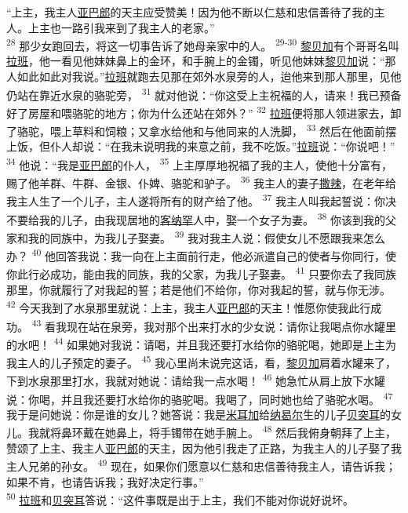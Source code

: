 “上主，我主人\uline{亚巴郎}的天主应受赞美！因为他不断以仁慈和忠信善待了我的主人。上主也一路引我来到了我主人的老家。”
\\
\indent
\textsuperscript{28}
那少女跑回去，将这一切事告诉了她母亲家中的人。
\textsuperscript{29-30}
\uline{黎贝加}有个哥哥名叫\uline{拉班}，他一看见他妹妹鼻上的金环，和手腕上的金镯，听见他妹妹\uline{黎贝加}说：“那人如此如此对我说。”\uline{拉班}就跑去见那在郊外水泉旁的人，迨他来到那人那里，见他仍站在靠近水泉的骆驼旁，
\textsuperscript{31}
就对他说：“你这受上主祝福的人，请来！我已预备好了房屋和喂骆驼的地方；你为什么还站在郊外？”
\textsuperscript{32}
\uline{拉班}便将那人领进家去，卸了骆驼，喂上草料和饲粮；又拿水给他和与他同来的人洗脚，
\textsuperscript{33}
然后在他面前摆上饭，但仆人却说：“在我未说明我的来意之前，我不吃饭。”\uline{拉班}说：“你说吧！”
\textsuperscript{34}
他说：“我是\uline{亚巴郎}的仆人，
\textsuperscript{35}
上主厚厚地祝福了我的主人，使他十分富有，赐了他羊群、牛群、金银、仆婢、骆驼和驴子。
\textsuperscript{36}
我主人的妻子\uline{撒辣}，在老年给我主人生了一个儿子，主人遂将所有的财产给了他。
\textsuperscript{37}
我主人叫我起誓说：你决不要给我的儿子，由我现居地的\uline{客纳罕}人中，娶一个女子为妻。
\textsuperscript{38}
你该到我的父家和我的同族中，为我儿子娶妻。
\textsuperscript{39}
我对我主人说：假使女儿不愿跟我来怎么办？
\textsuperscript{40}
他回答我说：我一向在上主面前行走，他必派遣自己的使者与你同行，使你此行必成功，能由我的同族，我的父家，为我儿子娶妻。
\textsuperscript{41}
只要你去了我同族那里，你就履行了对我起的誓；若是他们不给你，你对我起的誓，就与你无涉。
\textsuperscript{42}
今天我到了水泉那里就说：上主，我主人\uline{亚巴郎}的天主！惟愿你使我此行成功。
\textsuperscript{43}
看我现在站在泉旁，我对那个出来打水的少女说：请你让我喝点你水罐里的水吧！
\textsuperscript{44}
如果她对我说：请喝，并且我还要打水给你的骆驼喝，她即是上主为我主人的儿子预定的妻子。
\textsuperscript{45}
我心里尚未说完这话，看，\uline{黎贝加}肩着水罐来了，下到水泉那里打水，我就对她说：请给我一点水喝！
\textsuperscript{46}
她急忙从肩上放下水罐说：你喝，并且我还要打水给你的骆驼喝。我喝了，同时她也给了骆驼水喝。
\textsuperscript{47}
我于是问她说：你是谁的女儿？她答说：我是\uline{米耳加}给\uline{纳曷尔}生的儿子\uline{贝突耳}的女儿。我就将鼻环戴在她鼻上，将手镯带在她手腕上。
\textsuperscript{48}
然后我俯身朝拜了上主，赞颂了上主、我主人\uline{亚巴郎}的天主，因为他引我走了正路，为我主人的儿子娶了我主人兄弟的孙女。
\textsuperscript{49}
现在，如果你们愿意以仁慈和忠信善待我主人，请告诉我；如果不肯，也请告诉我；我好决定行事。”
\\
\indent
\textsuperscript{50}
\uline{拉班}和\uline{贝突耳}答说：“这件事既是出于上主，我们不能对你说好说坏。
